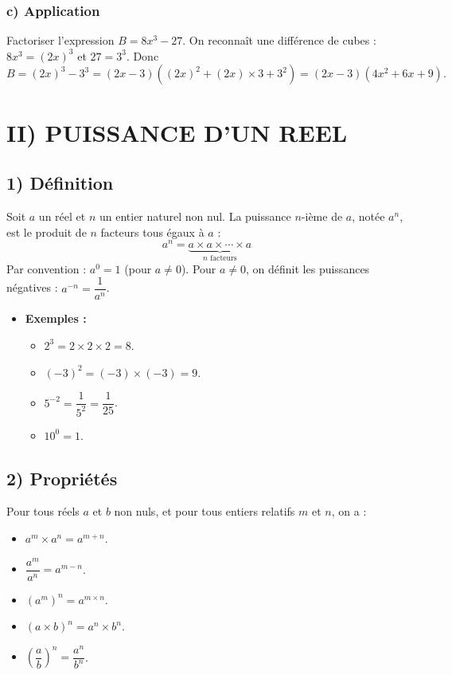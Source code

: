 \documentclass[12pt,a4paper]{article}
\begin{document}
\subsubsection*{\color{myred} c) Application}
Factoriser l'expression $B = 8x^3 - 27$.
On reconnaît une différence de cubes : $8x^3 = (2x)^3$ et $27 = 3^3$.
Donc
\[
B = (2x)^3 - 3^3 = (2x-3)\left((2x)^2 + (2x)\times 3 + 3^2\right) = (2x-3)(4x^2 + 6x + 9).
\]


\section*{\color{myred} II) PUISSANCE D'UN REEL}

\subsection*{\color{myred} 1) Définition}
Soit $a$ un réel et $n$ un entier naturel non nul. La puissance $n$-ième de $a$, notée $a^n$, est le produit de $n$ facteurs tous égaux à $a$ :
\[
a^n = \underbrace{a \times a \times \cdots \times a}_{n \text{ facteurs}}
\]
Par convention : $a^0 = 1$ (pour $a \neq 0$). Pour $a \neq 0$, on définit les puissances négatives : $a^{-n} = \dfrac{1}{a^n}$.

\begin{itemize}
    \item \textbf{Exemples :}
    \begin{itemize}
        \item $2^3 = 2 \times 2 \times 2 = 8$.
        \item $(-3)^2 = (-3) \times (-3) = 9$.
        \item $5^{-2} = \dfrac{1}{5^2} = \dfrac{1}{25}$.
        \item $10^0 = 1$.
    \end{itemize}
\end{itemize}

\subsection*{\color{myred} 2) Propriétés}
Pour tous réels $a$ et $b$ non nuls, et pour tous entiers relatifs $m$ et $n$, on a :
\begin{itemize}
    \item $a^m \times a^n = a^{m+n}$.
    \item $\dfrac{a^m}{a^n} = a^{m-n}$.
    \item $(a^m)^n = a^{m \times n}$.
    \item $(a \times b)^n = a^n \times b^n$.
    \item $\left(\dfrac{a}{b}\right)^n = \dfrac{a^n}{b^n}$.
\end{itemize}
\end{document}
